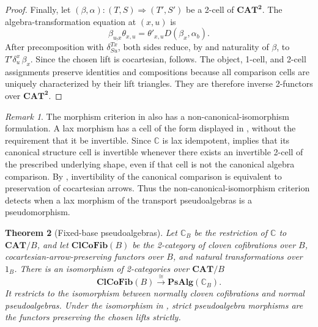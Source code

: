 \documentclass[11pt]{article}
\theoremstyle{plain}
\newtheorem{theorem}{Theorem}[section]
\theoremstyle{definition}
\theoremstyle{remark}
\newtheorem{remark}[theorem]{Remark}
\newcommand{\CAT}{\mathbf{CAT}}
\newcommand{\ClCoFib}{\mathbf{ClCoFib}}
\newcommand{\PsAlg}{\mathbf{PsAlg}}
\newcommand{\C}{\mathbb{C}}
\numberwithin{equation}{section}
\begin{document}
\begin{proof}
Finally, let
$(\beta,\alpha)\colon(T,S)\Rightarrow(T',S')$ be a 2-cell of
$\CAT^{\mathbf 2}$.  The algebra-transformation equation at $(x,u)$ is
\begin{equation}
  \beta_{u_!x}\theta_{x,u}
  =\theta'_{x,u}D(\beta_x,\alpha_b).
  \label{eq:pseudo-algebra-transformation}
\end{equation}
After precomposition with $\delta^{Tx}_{Su}$, both sides reduce, by
 and naturality of $\beta$, to
$T'\delta^x_u\,\beta_x$.  Since the chosen lift is cocartesian,
 follows.  The object, 1-cell,
and 2-cell assignments preserve identities and compositions because
all comparison cells are uniquely characterized by their lift
triangles.  They are therefore inverse 2-functors over
$\CAT^{\mathbf 2}$.
\end{proof}

\begin{remark}\label{rem:noncanonical-pseudomorphisms}
The morphism criterion in  also has a
non-canonical-isomorphism formulation.  A lax morphism has a cell of the
form displayed in , without the requirement that
it be invertible.  Since $\C$ is lax idempotent,
\citet[Corollary~3.5]{LucatelliNunes2019} implies that its canonical
structure cell is invertible whenever there exists an invertible
2-cell of the prescribed underlying shape, even if that cell is not the
canonical algebra comparison.  By ,
invertibility of the canonical comparison is equivalent to preservation of
cocartesian arrows.  Thus the non-canonical-isomorphism criterion detects
when a lax morphism of the transport pseudoalgebras is a
pseudomorphism.
\end{remark}

\begin{theorem}[Fixed-base pseudoalgebras]
\label{thm:fixed-base-pseudo}
Let $\C_B$ be the restriction of $\C$ to $\CAT/B$, and let
$\ClCoFib(B)$ be the 2-category of cloven cofibrations over $B$,
cocartesian-arrow-preserving functors over $B$, and natural
transformations over $1_B$.  There is an isomorphism of 2-categories
over $\CAT/B$
\begin{equation}
  \ClCoFib(B)\xrightarrow{\ \cong\ }\PsAlg(\C_B).
  \label{eq:fixed-base-pseudo-comparison}
\end{equation}
It restricts to the isomorphism between normally cloven cofibrations and
normal pseudoalgebras.  Under the isomorphism in
,
strict pseudoalgebra morphisms are the functors preserving the
chosen lifts strictly.
\end{theorem}
\end{document}
